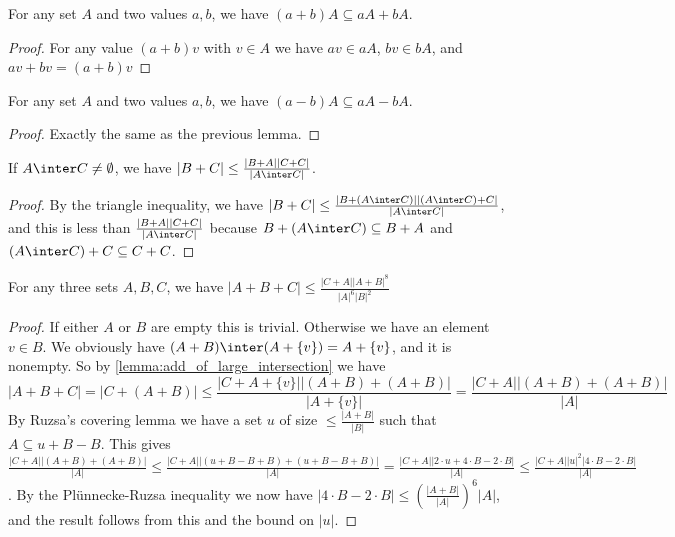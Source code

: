 \begin{lemma}
    \leanok
    For any set $A$ and two values $a, b$, we have $(a+b)A \subseteq aA + bA$.
\end{lemma}

\begin{proof}
    \leanok
    For any value $(a+b) v$ with $v \in A$ we have $a v \in a A$, $b v \in b A$, and $a v + b v = (a+b)v$
\end{proof}

\begin{lemma}
    \leanok
    For any set $A$ and two values $a, b$, we have $(a-b)A \subseteq aA - bA$.
\end{lemma}

\begin{proof}
    \leanok
    Exactly the same as the previous lemma.
\end{proof}

\begin{lemma}
    \label{lemma:add_of_large_intersection}
    \leanok
    If $A \inter C \neq \emptyset$, we have $|B+C| \leq \frac{|B+A| |C+C|}{|A \inter C|}$.
\end{lemma}

\begin{proof}
    \leanok
    By the triangle inequality, we have $|B+C| \leq \frac{|B + (A \inter C)| |(A \inter C) + C|}{|A \inter C|}$,
    and this is less than $\frac{|B+A| |C+C|}{|A \inter C|}$ because
    $B + (A \inter C)\subseteq B+A$ and $(A \inter C) + C \subseteq C + C$.
\end{proof}

\begin{lemma}
    \leanok
    For any three sets $A, B, C$, we have $|A+B+C| \leq \frac{|C+A| |A+B|^8}{|A|^6 |B|^2}$
\end{lemma}

\begin{proof}
    \leanok
    If either $A$ or $B$ are empty this is trivial.
    Otherwise we have an element $v \in B$. We obviously have $(A + B) \inter (A + \{v\}) = A + \{v\}$, and
    it is nonempty. So by \ref{lemma:add_of_large_intersection} we have
    $$
    |A+B+C| = |C + (A+B)| \leq \frac{|C + A + \{v\}| |(A+B) + (A+B)|}{|A + \{v\}|} = 
    \frac{|C + A| |(A+B) + (A+B)|}{|A|}
    $$
    By Ruzsa's covering lemma we have a set $u$ of size $\leq \frac{|A+B|}{|B|}$ such that $A \subseteq u + B - B$.
    This gives $\frac{|C + A| |(A+B) + (A+B)|}{|A|} \leq \frac{|C + A| |(u+B-B+B) + (u+B-B+B)|}{|A|} =
    \frac{|C + A| |2 \cdot u + 4 \cdot B - 2 \cdot B|}{|A|} \leq \frac{|C + A| |u|^2 |4 \cdot B - 2 \cdot B|}{|A|}$.
    By the Plünnecke-Ruzsa inequality we now have $|4 \cdot B - 2 \cdot B| \leq (\frac{|A+B|}{|A|})^6 |A|$,
    and the result follows from this and the bound on $|u|$.
\end{proof}


